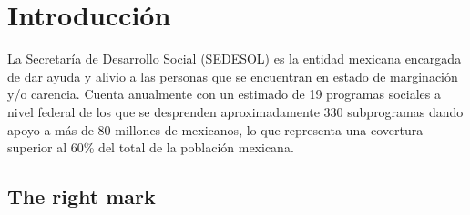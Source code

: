 \chapter{Introducción}
La Secretaría de Desarrollo Social (SEDESOL) es la entidad mexicana encargada de dar ayuda y alivio a las personas que se encuentran en estado de marginación y/o carencia. Cuenta anualmente con un estimado de 19 programas sociales a nivel federal de los que se desprenden aproximadamente 330 subprogramas dando apoyo a más de 80 millones de mexicanos, lo que representa una covertura superior al 60\% del total de la población mexicana.

\section{The right mark}

